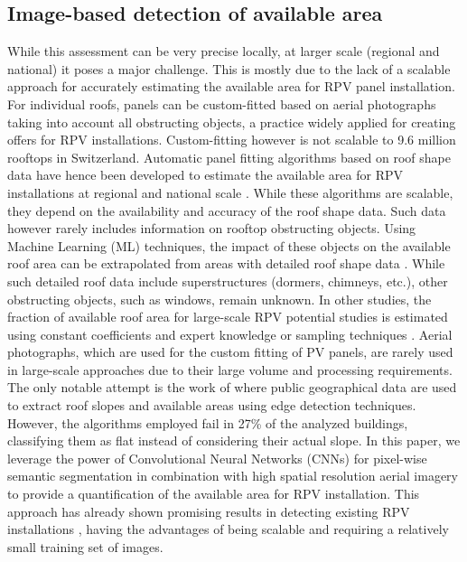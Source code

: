 \subsection{Image-based detection of available area}
\label{scenario_area}
While this assessment can be very precise locally, at larger scale (regional and national) it poses a major challenge. This is mostly due to the lack of a scalable approach for accurately estimating the available area for RPV panel installation. For individual roofs, panels can be custom-fitted based on aerial photographs taking into account all obstructing objects, a practice widely applied for creating offers for RPV installations. Custom-fitting however is not scalable to 9.6 million rooftops in Switzerland. Automatic panel fitting algorithms based on roof shape data have hence been developed to estimate the available area for RPV installations at regional and national scale \cite{assouline_large-scale_2018, walch_big_2020}. While these algorithms are scalable, they depend on the availability and accuracy of the roof shape data. Such data however rarely includes information on rooftop obstructing objects. Using Machine Learning (ML) techniques, the impact of these objects on the available roof area can be extrapolated from areas with detailed roof shape data \cite{assouline_large-scale_2018, walch_big_2020}. While such detailed roof data include superstructures (dormers, chimneys, etc.), other obstructing objects, such as windows, remain unknown. In other studies, the fraction of available roof area for large-scale RPV potential studies is estimated using constant coefficients and expert knowledge \cite{portmann_sonnendach.ch:_2016} or sampling techniques \cite{wiginton_quantifying_2010}. Aerial photographs, which are used for the custom fitting of PV panels, are rarely used in large-scale approaches due to their large volume and processing requirements. The only notable attempt is the work of \citet{mainzer_assessment_2017} where public geographical data are used to extract roof slopes and available areas using edge detection techniques. However, the algorithms employed fail in 27\% of the analyzed buildings, classifying them as flat instead of considering their actual slope. 
In this paper, we leverage the power of Convolutional Neural Networks (CNNs) for pixel-wise semantic segmentation in combination with high spatial resolution aerial imagery to provide a quantification of the available area for RPV installation. This approach has already shown promising results in detecting existing RPV installations \cite{castello_deep_2019}, having the advantages of being scalable and requiring a relatively small training set of images.   

